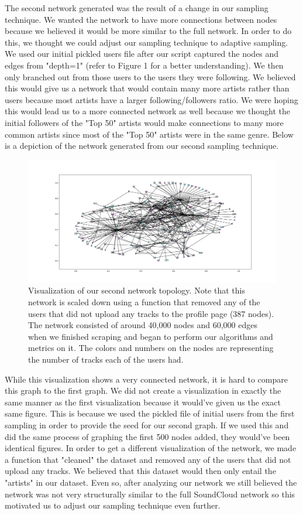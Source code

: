 \documentclass{article}
\begin{document}
The second network generated was the result of a change in our sampling technique.  We wanted the
network to have more connections between nodes because we believed it would be more similar to the
full network.  In order to do this, we thought we could adjust our sampling technique to adaptive
sampling.  We used our initial pickled users file after our script captured the nodes and edges from
"depth=1" (refer to Figure 1 for a better understanding).  We then only branched out from those users to the users they were following.  We believed this would give us a network that would contain many more artists rather than users because most artists have a larger following/followers ratio.  We were hoping this would lead us to a more connected network as well because we thought the initial followers of the "Top 50" artists would make connections to many more common artists since most of the "Top 50" artists were in the same genre.  Below is a depiction of the network generated from our second sampling technique.

\begin{figure}[h]
	\centering
	\includegraphics[scale=0.29]{take_2_visualization}
	\caption{Visualization of our second network topology.  Note that this network is scaled down using a function that removed any of the users that did not upload any tracks to the profile page (387 nodes).  The network consisted of around 40,000 nodes and 60,000 edges when we finished scraping and began to perform our algorithms and metrics on it.  The colors and numbers on the nodes are representing the number of tracks each of the users had.}
\end{figure}

While this visualization shows a very connected network, it is hard to compare this graph to the first graph.  We did not create a visualization in exactly the same manner as the first visualization because it would've given us the exact same figure.  This is because we used the pickled file of initial users from the first sampling in order to provide the seed for our second graph.  If we used this and did the same process of graphing the first 500 nodes added, they would've been identical figures.  In order to get a different visualization of the network, we made a function that "cleaned" the dataset and removed any of the users that did not upload any tracks.  We believed that this dataset would then only entail the "artists" in our dataset.  Even so, after analyzing our network we still believed the network was not very structurally similar to the full SoundCloud network so this motivated us to adjust our sampling technique even further.
\end{document}
